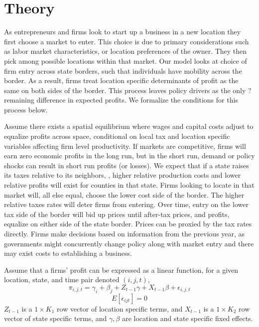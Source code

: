 \section{Theory}

As entrepreneurs and firms look to start up a business in a new location they first choose a market to enter. This choice is due to primary considerations such as labor market characteristics, or location preferences of the owner. They then pick among possible locations within that market. Our model looks at choice of firm entry across state borders, such that individuals have mobility across the border. As a result, firms treat location specific determinants of profit as the same on both sides of the border. This process leaves policy drivers as the only ? remaining difference in expected profits. We formalize the conditions for this process below. 

Assume there exists a spatial equilibrium where wages and capital costs adjust to equalize profits across space, conditional on local tax and location specific variables affecting firm level productivity. If markets are competitive, firms will earn zero economic profits in the long run, but in the short run, demand or policy shocks can result in short run profits (or losses). We expect that if a state raises its taxes relative to its neighbors, , higher relative production costs and lower  relative profits will exist for counties in that state.  Firms looking to locate in that market will, all else equal, choose the lower cost side of the border.  The higher relative taxes rates will  deter firms from entering. Over time,  entry on the lower tax side of the border will bid up prices until after-tax prices, and profits, equalize on either side of the state border. Prices can be proxied by the tax rates directly. Firms make decisions based on information from the previous year, as governments might concurrently change policy along with market entry and there may exist costs to establishing a business.

\begin{assumption}
Assume that a firms' profit can be expressed as a linear function, for a given location, state, and time pair denoted $(i,j,t)$,
\begin{equation}
\pi_{i,j,t} =  \gamma_{i}+\beta_{j}+Z_{t-1}\gamma+X_{t-1}\beta+\epsilon_{i,j,t}
\end{equation}
\begin{equation}
E[\epsilon_{ijt}] = 0
\end{equation}
$Z_{t-1}$ is a $1 \times K_{1}$ row vector of location specific terms, and $X_{t-1}$ is a $1 \times K_{2}$ row vector of state specific terms, and $\gamma, \beta$ are location and state specific fixed effects.
\end{assumption}

